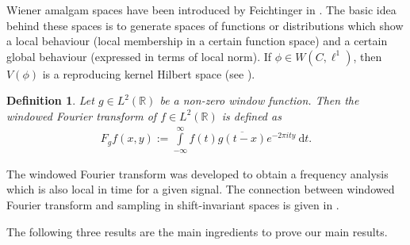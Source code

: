 \documentclass[a4paper,12pt,reqno]{amsart}
\theoremstyle{plain}
\numberwithin{equation}{section}
\newtheorem{defn}{Definition}[section]
\theoremstyle{definition}
\begin{document}
Wiener amalgam spaces have been introduced by Feichtinger in \cite{Feich}. The basic idea behind these spaces is to generate spaces of functions or distributions which show a local behaviour (local membership in a certain function space) and 
a certain global behaviour (expressed in terms of local norm). If $\phi\in W(C,\ell^1)$, then $V(\phi)$ is a reproducing kernel Hilbert space (see \cite{AlGr1}).
\begin{defn}
Let $g\in L^2(\mathbb{R})$ be a non-zero window function. Then
the windowed Fourier transform of $f\in L^2(\mathbb{R})$  is defined as
\begin{eqnarray}\label{STFT}
F_gf(x,y):=\int\limits_{-\infty}^{\infty}f(t)\overline{g(t-x)}e^{-2\pi ity}~\mathrm{d}t.
\end{eqnarray}
\end{defn}
The windowed Fourier transform was developed to obtain a frequency
analysis which is also local in time for a given signal. 
The connection between windowed Fourier transform and sampling in shift-invariant spaces
is given in \cite{Grochenig3}.

The following three results are the main ingredients to prove our main results.
\end{document}
